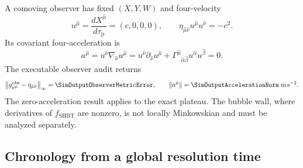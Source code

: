 A comoving observer has fixed \((X,Y,W)\) and four-velocity
\begin{equation}
  u^{\hat\mu}
  =
  \frac{dX^{\hat\mu}}{d\tau_{\mathrm p}}
  =
  (c,0,0,0),
  \qquad
  \eta_{\hat\mu\hat\nu}
  u^{\hat\mu}u^{\hat\nu}
  =
  -c^2.
  \label{eq:comoving-interior-four-velocity}
\end{equation}
Its covariant four-acceleration is
\begin{equation}
  a^{\hat\mu}
  =
  u^{\hat\nu}
  \nabla_{\hat\nu}
  u^{\hat\mu}
  =
  u^{\hat\nu}
  \partial_{\hat\nu}
  u^{\hat\mu}
  +
  \Gamma^{\hat\mu}{}_{\hat\alpha\hat\beta}
  u^{\hat\alpha}u^{\hat\beta}
  =
  0.
  \label{eq:interior-proper-acceleration-zero}
\end{equation}
The executable observer audit returns
\begin{equation}
  \left\|
    g_{\hat\mu\hat\nu}^{\mathrm{obs}}
    -
    \eta_{\hat\mu\hat\nu}
  \right\|_{\infty}
  =
  \SimOutputObserverMetricError,
  \qquad
  \|a^{\hat\mu}\|
  =
  \SimOutputAccelerationNorm
  \;\mathrm{m\,s^{-2}}.
  \label{eq:numerical-observer-audit}
\end{equation}
The zero-acceleration result applies to the exact plateau.  The bubble wall,
where derivatives of \(f_{\mathrm{SHBT}}\) are nonzero, is not locally
Minkowskian and must be analyzed separately.

\subsection{Chronology from a global resolution time}

